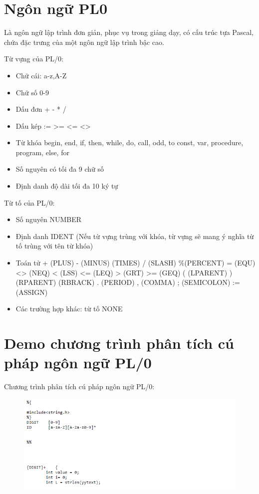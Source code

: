 \documentclass[14pt,a4paper]{extreport}
\begin{document}
\chapter{Ngôn ngữ PL0}
Là ngôn ngữ lập trình đơn giản, phục vụ trong giảng dạy, có cấu trúc tựa Pascal, chứa đặc trưng của một ngôn ngữ lập trình bậc cao.

Từ vựng của PL/0:
\begin{itemize}
	\item Chữ cái: a-z,A-Z
	\item Chữ số 0-9
	\item Dấu đơn   +  - *  /  %
	\item Dấu kép   := >= <= <>
	\item Từ khóa begin, end, if, then, while, do, call, odd, to const, var, procedure, program, else, for
	\item Số nguyên có tối đa 9 chữ số
	\item Định danh độ dài tối đa 10 ký tự
\end{itemize}

Từ tố của PL/0:
\begin{itemize}
	\item Số nguyên  NUMBER
	\item Định danh IDENT (Nếu từ vựng trùng với khóa, từ vựng sẽ mang ý nghĩa từ tố trùng với tên từ khóa)
	\item Toán tử 
		\subitem	+ (PLUS)	 - (MINUS)
		\subitem	* (TIMES) 	/ (SLASH) 	\%(PERCENT) 
		\subitem 	= (EQU)	 	<> (NEQ) 
		\subitem 	< (LSS) 		<= (LEQ) 
		\subitem 	> (GRT) 		>= (GEQ) 
		\subitem ( (LPARENT) 		) (RPARENT) 
		\subitem 	[ (LBRACK) 		] (RBRACK) 
		\subitem 	. (PERIOD) 
		\subitem 	, (COMMA) 
		\subitem 	; (SEMICOLON) 
		\subitem 	:= (ASSIGN)
	\item Các trường hợp khác: từ tố NONE
\end{itemize}

\chapter{Demo chương trình phân tích cú pháp ngôn ngữ PL/0}
Chương trình phân tích cú pháp ngôn ngữ PL/0:
\begin{figure}
	\centering
	\includegraphics[scale=1]{d1}
\end{figure}
\end{document}
